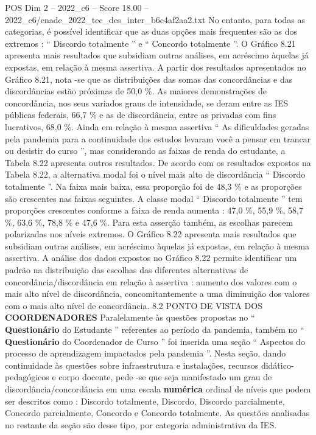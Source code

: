 \begin{textsample}{POS Dim 2 – 2022\_c6 – Score 18.00 – 2022\_c6/enade\_2022\_tec\_des\_inter\_b6c4af2aa2.txt}
No entanto, para todas as categorias, é possível identificar que as duas opções mais frequentes são as dos extremos : “ Discordo totalmente ” e “ Concordo totalmente ”.
O Gráfico 8.21 apresenta mais resultados que subsidiam outras análises, em acréscimo àquelas já expostas, em relação à mesma assertiva.
A partir dos resultados apresentados no Gráfico 8.21, nota -se que as distribuições das somas das concordâncias e das discordâncias estão próximas de 50,0 \%.
As maiores demonstrações de concordância, nos seus variados graus de intensidade, se deram entre as IES públicas federais, 66,7 \% e as de discordância, entre as privadas com fins lucrativos, 68,0 \%.
Ainda em relação à mesma assertiva “ As dificuldades geradas pela pandemia para a continuidade dos estudos levaram você a pensar em trancar ou desistir do curso ”, mas considerando as faixas de renda do estudante, a Tabela 8.22 apresenta outros resultados.
De acordo com os resultados expostos na Tabela 8.22, a alternativa modal foi o nível mais alto de discordância “ Discordo totalmente ”.
Na faixa mais baixa, essa proporção foi de 48,3 \% e as proporções são crescentes nas faixas seguintes.
A classe modal “ Discordo totalmente ” tem proporções crescentes conforme a faixa de renda aumenta : 47,0 \%, 55,9 \%, 58,7 \%, 63,6 \%, 78,8 \% e 47,6 \%.
Para esta asserção também, as escolhas parecem polarizadas nos níveis extremos.
O Gráfico 8.22 apresenta mais resultados que subsidiam outras análises, em acréscimo àquelas já expostas, em relação à mesma assertiva.
A análise dos dados expostos no Gráfico 8.22 permite identificar um padrão na distribuição das escolhas das diferentes alternativas de concordância/discordância em relação à assertiva : aumento dos valores com o mais alto nível de discordância, concomitantemente a uma diminuição dos valores com o mais alto nível de concordância. 8.2 PONTO DE VISTA DOS \textbf{COORDENADORES} Paralelamente às questões propostas no “ \textbf{Questionário} do Estudante ” referentes ao período da pandemia, também no “ \textbf{Questionário} do Coordenador de Curso ” foi inserida uma seção “ Aspectos do processo de aprendizagem impactados pela pandemia ”.
Nesta seção, dando continuidade às questões sobre infraestrutura e instalações, recursos didático-pedagógicos e corpo docente, pede -se que seja manifestado um grau de discordância/concordância em uma escala \textbf{numérica} ordinal de níveis que podem ser descritos como : Discordo totalmente, Discordo, Discordo parcialmente, Concordo parcialmente, Concordo e Concordo totalmente.
As questões analisadas no restante da seção são desse tipo, por categoria administrativa da IES.

\end{textsample}
